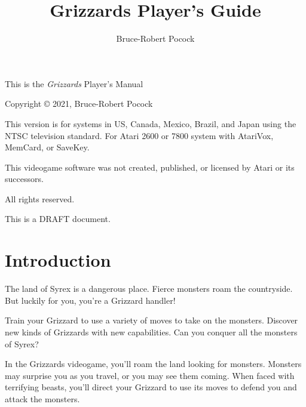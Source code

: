 \documentclass[12pt,twoside,openright,book]{memoir}
\title{Grizzards Player's Guide}
\author{Bruce-Robert Pocock}
\makeatletter
\newcommand\TV{NTSC}
\newcommand\REGION{US, Canada, Mexico, Brazil, and Japan}
\newcommand\TV{PAL}
\newcommand\REGION{UK and Europe (except France)}
\newcommand\TV{SECAM}
\newcommand\REGION{France, Russia, Africa}
\def\maketitle{%
  \null
  \thispagestyle{empty}%
  \vfill
  \begin{center}\leavevmode
    \normalfont
    {\LARGE\raggedleft \@author\par}%
    \hrulefill\par
    {\huge\raggedright \@title\par}%
    \vskip 1cm
  \end{center}%
  \vfill
  \null
  \cleardoublepage
  }
\makeatother
\begin{document}


\maketitle

\frontmatter

\null\vfill

\begin{flushleft}
This is the \textit{Grizzards} Player's Manual

Copyright \copyright{} 2021, Bruce-Robert Pocock

\bigskip

This  version is  for systems  in \REGION{}  using the  \TV{} television
standard.  For  Atari  2600  or  7800  system  with  AtariVox,  MemCard,
or SaveKey.

\bigskip

This videogame software was not created, published, or licensed by Atari
or its successors.

\bigskip

\thedate

\bigskip

All rights reserved.

\bigskip

This is a DRAFT document.

\end{flushleft}
\let\cleardoublepage\clearpage

\mainmatter

\chapter{Introduction}\label{Introduction}

The  land of  Syrex  is  a dangerous  place.  Fierce  monsters roam  the
countryside. But luckily for you, you're a Grizzard handler!

Train your Grizzard to  use a variety of moves to  take on the monsters.
Discover new kinds  of Grizzards with new capabilities.  Can you conquer
all the monsters of Syrex?

In the Grizzards  videogame, you'll roam the land  looking for monsters.
Monsters may  surprise you as  you travel, or  you may see  them coming.
When faced  with terrifying beasts,  you'll direct your Grizzard  to use
its moves to defend you and attack the monsters.

\cleardoublepage

\tableofcontents
\end{document}
